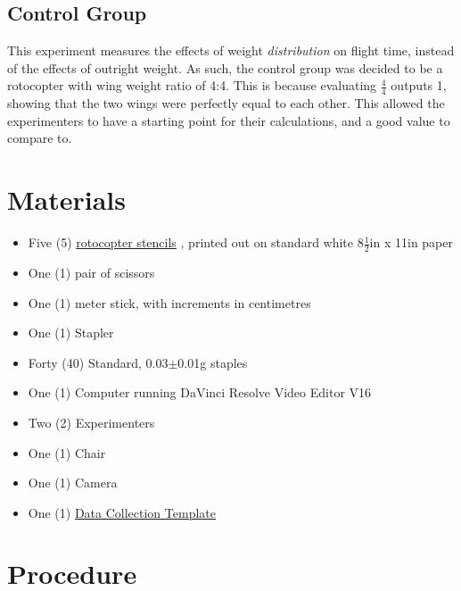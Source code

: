 \documentclass[]{article}
\theoremstyle{definition}
\begin{document}
\subsection{Control Group}
This experiment measures the effects of weight \textit{distribution} on flight time, instead of the effects of outright weight. As such, the control group was decided to be a rotocopter with wing weight ratio of 4:4. This is because evaluating $\frac{4}{4}$ outputs 1, showing that the two wings were perfectly equal to each other. This allowed the experimenters to have a starting point for their calculations, and a good value to compare to.

\section{Materials}
\begin{itemize}
    \item Five (5) \href{https://drive.google.com/file/d/1QfuTmu_a4X0YLBoxiQi08fJsUGnnO4zp/view}{rotocopter stencils} , printed out on standard white $8\frac{1}{2}$in x 11in paper
    \item One (1) pair of scissors
    \item One (1) meter stick, with increments in centimetres
    \item One (1) Stapler 
    \item Forty (40) Standard, 0.03$\pm$0.01g staples
    \item One (1) Computer running DaVinci Resolve Video Editor V16
    \item Two (2) Experimenters
    \item One (1) Chair
    \item One (1) Camera
    \item One (1) \href{https://docs.google.com/spreadsheets/d/1fByH_D420FM5xx0zt5tHyaEZ7hWkV1IXYVKtugBasig/edit?usp=sharing}{Data Collection Template}
\end{itemize} 

\section{Procedure} \label{Procedure}
\end{document}

